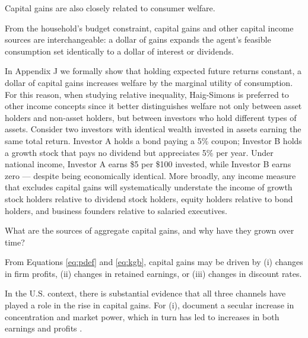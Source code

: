 \documentclass[12pt]{article}
\begin{document}
Capital gains are also closely related to consumer welfare.
\begin{remark} \label{remark:hs_inc}  From the household's budget constraint, capital gains and other capital income sources are interchangeable: a dollar of gains expands the agent's feasible consumption set identically to a dollar of interest or dividends.   \end{remark} 

In Appendix J we formally show that holding expected future returns constant, a dollar of capital gains increases welfare by the marginal utility of consumption. For this reason, when studying relative inequality, Haig-Simons is preferred to other income concepts since it better distinguishes welfare not only between asset holders and non-asset holders, but between investors who hold different types of assets. Consider two investors with identical wealth invested in assets earning the same total return. Investor A holds a bond paying a 5\% coupon; Investor B holds a growth stock that pays no dividend but appreciates 5\% per year. Under national income, Investor A earns \$5 per \$100 invested, while Investor B earns zero — despite being economically identical. More broadly, any income measure that excludes capital gains will systematically understate the income of growth stock holders relative to dividend stock holders, equity holders relative to bond holders, and business founders relative to salaried executives.


What are the sources of aggregate capital gains, and why have they grown over time?
\begin{remark} \label{remark:hs_src} From Equations \ref{eq:pdef} and \ref{eq:kgb}, capital gains may be driven by (i) changes in firm profits, (ii) changes in retained earnings, or (iii) changes in discount rates.  \end{remark} 

\noindent In the U.S. context, there is substantial evidence that all three channels have played a role in the rise in capital gains. For (i), \citet{grullon2019us,autor2020fall} document a secular increase in concentration and market power, which in turn has led to increases in both earnings and profits \citep{barkai2020declining,eeckhout2024value}. 
\end{document}
